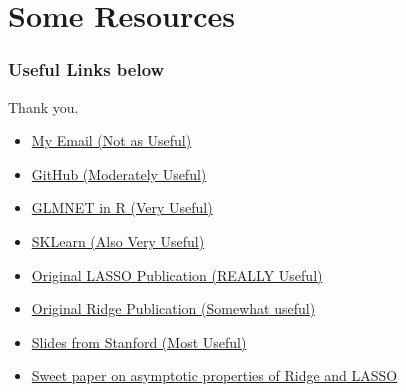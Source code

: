 \documentclass[]{beamer}
\begin{document}
\section{Some Resources}
\begin{frame}
\frametitle{Useful Links below}
Thank you.
\begin{itemize}
\item<1-> \href{mailto:fja2114@columbia.edu}{My Email (Not as Useful)}
\item<2-> \href{https://github.com/franciscojavierarceo/Regularization}{GitHub (Moderately Useful)}
\item<3-> \href{http://cran.r-project.org/web/packages/glmnet/glmnet.pdf}{GLMNET in R (Very Useful)}
\item<4-> \href{http://scikit-learn.org/0.10/auto_examples/linear_model/lasso_and_elasticnet.html}{SKLearn (Also Very Useful)}
\item<5-> \href{http://statweb.stanford.edu/~tibs/lasso/lasso.pdf}{Original LASSO Publication (REALLY Useful)}
\item<6-> \href{http://math.arizona.edu/~hzhang/math574m/Read/Ridge.pdf}{Original Ridge Publication (Somewhat useful)}
\item<7-> \href{http://statweb.stanford.edu/~owen/courses/305/Rudyregularization.pdf}{Slides from Stanford (Most Useful)}
\item<8-> \href{http://arxiv.org/pdf/1306.5505v3.pdf}{Sweet paper on asymptotic properties of Ridge and LASSO}
\end{itemize}
\end{frame}
\end{document}
